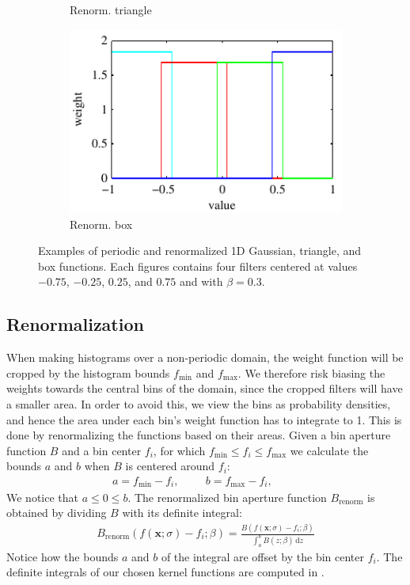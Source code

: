 \documentclass[thesis.tex]{subfiles}
\def\x{\mathbf{x}}
\begin{document}
\begin{figure}[tb]
\begin{subfigure}[t]{0.32\textwidth}
		\caption{Renorm. triangle}
		\label{fig:1dFilterTriangleRenorm}
	\end{subfigure}
	\begin{subfigure}[t]{0.32\textwidth}
		\includegraphics[width=\textwidth]{img/binFilterBoxRenorm.pdf}
		\caption{Renorm. box}
		\label{fig:1dFilterBoxRenorm}
	\end{subfigure}
	\caption{Examples of periodic and renormalized 1D Gaussian, triangle, and box functions. Each figures contains four filters centered at values $-0.75$, $-0.25$, $0.25$, and $0.75$ and with $\beta = 0.3$.}
	\label{fig:1dFilters}
\end{figure}

\subsection{Renormalization}
\label{sec:histogramRenormalization}
When making histograms over a non-periodic domain, the weight function will be cropped by the histogram bounds $f_\text{min}$ and $f_\text{max}$. We therefore risk biasing the weights towards the central bins of the domain, since the cropped filters will have a smaller area. In order to avoid this, we view the bins as probability densities, and hence the area under each bin's weight function has to integrate to 1. This is done by renormalizing the functions based on their areas. Given a bin aperture function $B$ and a bin center $f_i$, for which $f_\text{min} \leq f_i \leq f_\text{max}$ we calculate the bounds $a$ and $b$ when $B$ is centered around $f_i$:
\begin{align*}
	a = f_\text{min} - f_i,\hspace{1cm}
	b = f_\text{max} - f_i,\hspace{1cm}
\end{align*}
We notice that $a \leq 0 \leq b$. The renormalized bin aperture function $B_\text{renorm}$ is obtained by dividing $B$ with its definite integral:
\begin{align*}
	B_\text{renorm}\left( f(\x;\sigma)-f_i;\beta \right) = \frac{B \left(f(\x;\sigma)-f_i;\beta \right)}{\int_a^b B \left( z;\beta \right)\,\text{d}z}
\end{align*}
Notice how the bounds $a$ and $b$ of the integral are offset by the bin center $f_i$. The definite integrals of our chosen kernel functions are computed in .
\end{document}
